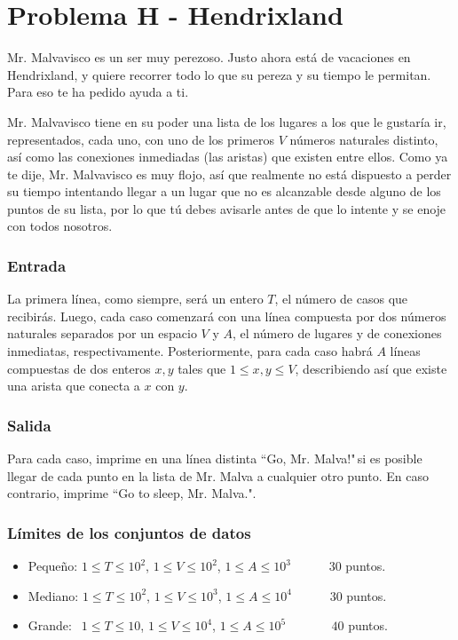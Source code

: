 \chapter*{Problema H - Hendrixland}

Mr. Malvavisco es un ser muy perezoso. Justo ahora está de
vacaciones en Hendrixland, y quiere recorrer todo lo que 
su pereza y su tiempo le permitan. Para eso te ha pedido
ayuda a ti. 

Mr. Malvavisco tiene en su poder una lista de los lugares
a los que le gustaría ir, representados, cada uno, con uno
de los primeros $V$ números naturales distinto, así como 
las conexiones inmediadas (las aristas) que existen entre 
ellos. Como ya te dije, Mr. Malvavisco es muy flojo, así 
que realmente no está dispuesto a perder su tiempo 
intentando llegar a un lugar que no es alcanzable desde 
alguno de los puntos de su lista, por lo que tú debes 
avisarle antes de que lo intente y se enoje con todos 
nosotros.



\subsection*{Entrada}
La primera línea, como siempre, será un entero $T$, el 
número de casos que recibirás. Luego, cada caso comenzará
con una línea compuesta por dos números naturales 
separados por un espacio $V$ y $A$, el número de lugares y
de conexiones inmediatas, respectivamente.
Posteriormente, para cada caso habrá $A$ líneas compuestas
de dos enteros $x, y$ tales que $1 \leq x, y \leq V$,
describiendo así que existe una arista que conecta a $x$
con $y$.



\subsection*{Salida}
Para cada caso, imprime en una línea distinta ``Go, Mr. 
Malva!"$\,$si es posible llegar de cada punto en la lista
de Mr. Malva a cualquier otro punto. En caso contrario,
imprime ``Go to sleep, Mr. Malva.".



\subsection*{Límites de los conjuntos de datos}

\begin{itemize}
    \item Pequeño: $ 1 \leq T \leq 10^2 $, $ 1 \leq V \leq
    10^2 $, $ 1 \leq A \leq 10^3 $    $\quad \;\;\;\;\;$ 
    $30$ puntos.
    \item Mediano: $ 1 \leq T \leq 10^2 $, $ 1 \leq V \leq
    10^3 $, $ 1 \leq A \leq 10^4 $    $\quad \;\;\;\;\;$ 
    $30$ puntos.
    \item Grande: $ \;\, 1 \leq T \leq 10 $, $ 1 \leq V \leq
    10^4 $, $ 1 \leq A \leq 10^5 $  $\quad \quad \quad$ 
    $40$ puntos.
\end{itemize}



